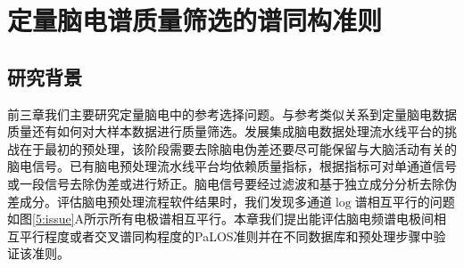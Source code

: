 \chapter{定量脑电谱质量筛选的谱同构准则}
\section{研究背景}
前三章我们主要研究定量脑电中的参考选择问题。与参考类似关系到定量脑电数据质量还有如何对大样本数据进行质量筛选。发展集成脑电数据处理流水线平台的挑战在于最初的预处理，该阶段需要去除脑电伪差还要尽可能保留与大脑活动有关的脑电信号。已有脑电预处理流水线平台均依赖质量指标，根据指标可对单通道信号或一段信号去除伪差或进行矫正。脑电信号要经过滤波和基于独立成分分析去除伪差成分。评估脑电预处理流程软件结果时，我们发现多通道$\log$谱相互平行的问题如图\ref{5:issue}A所示所有电极谱相互平行。本章我们提出能评估脑电频谱电极间相互平行程度或者交叉谱同构程度的PaLOS准则并在不同数据库和预处理步骤中验证该准则。

